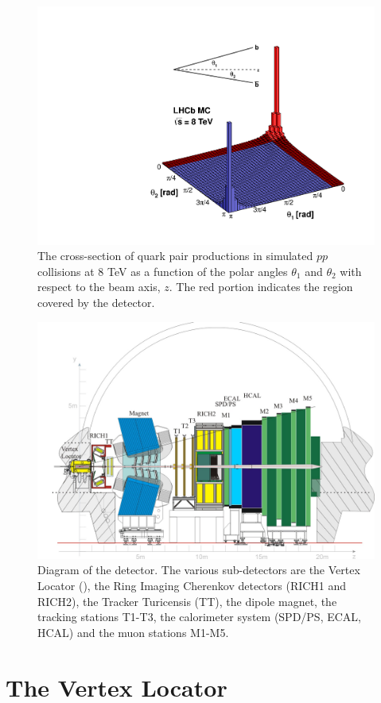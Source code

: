 \begin{figure}
\centering
\includegraphics[width=0.5\linewidth]{figures/detector/08_rad_acc_scheme_right.pdf}
\caption{The cross-section of \bquark\bquarkbar quark pair productions in simulated $pp$ collisions at 8 TeV as a function of the polar angles $\theta_1$ and $\theta_2$ with respect to the beam axis, $z$. The red portion indicates the region covered by the \lhcb detector.}
\label{bbar}
\end{figure}

\begin{figure}
\includegraphics[width=\linewidth]{figures/detector/lhcb.pdf}
\caption{Diagram of the \lhcb detector. The various sub-detectors are the Vertex Locator (\velo), the Ring Imaging Cherenkov detectors (RICH1 and RICH2), the Tracker Turicensis (TT), the dipole magnet, the tracking stations T1-T3, the calorimeter system (SPD/PS, ECAL, HCAL) and the muon stations M1-M5.}
\label{lhcbdetector}
\end{figure}

\section{The Vertex Locator}
\label{sec:detector:velo}

